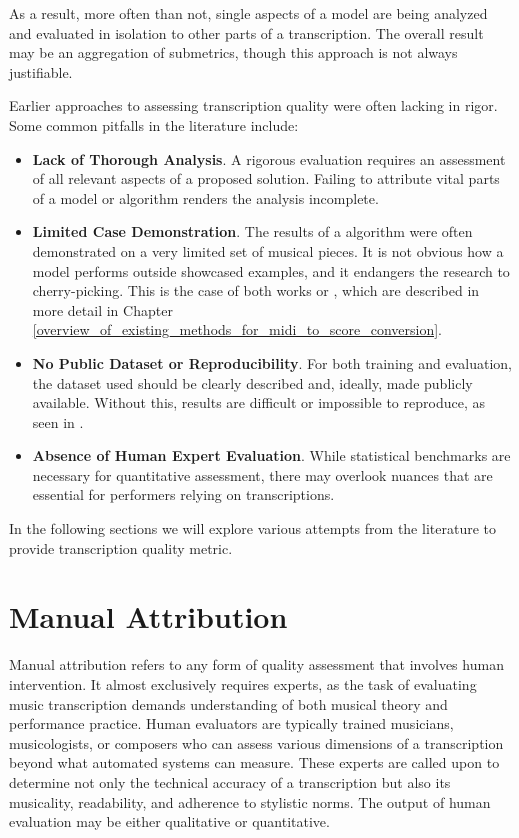 As a result, more often than not, single aspects of a model are being analyzed and evaluated in isolation to other parts of a transcription. The overall result may be an aggregation of submetrics, though this approach is not always justifiable.

Earlier approaches to assessing transcription quality were often lacking in rigor. Some common pitfalls in the literature include:\begin{itemize}
	\item {\bf Lack of Thorough Analysis}. A rigorous evaluation requires an assessment of all relevant aspects of a proposed solution. Failing to attribute vital parts of a model or algorithm renders the analysis incomplete.
	\item {\bf Limited Case Demonstration}. The results of a algorithm were often demonstrated on a very limited set of musical pieces. It is not obvious how a model performs outside showcased examples, and it endangers the research to cherry-picking. This is the case of both works \cite{Takeda2002} or \cite{Yang2005}, which are described in more detail in Chapter \ref{overview_of_existing_methods_for_midi_to_score_conversion}.
	\item {\bf No Public Dataset or Reproducibility}. For both training and evaluation, the dataset used should be clearly described and, ideally, made publicly available. Without this, results are difficult or impossible to reproduce, as seen in \cite{Takeda2002}.
	\item {\bf Absence of Human Expert Evaluation}. While statistical benchmarks are necessary for quantitative assessment, there may overlook nuances that are essential for performers relying on transcriptions. 
\end{itemize} 

In the following sections we will explore various attempts from the literature to provide transcription quality metric.

\section{Manual Attribution}

Manual attribution refers to any form of quality assessment that involves human intervention. It almost exclusively requires experts, as the task of evaluating music transcription demands understanding of both musical theory and performance practice. Human evaluators are typically trained musicians, musicologists, or composers who can assess various dimensions of a transcription beyond what automated systems can measure. These experts are called upon to determine not only the technical accuracy of a transcription but also its musicality, readability, and adherence to stylistic norms. The output of human evaluation may be either qualitative or quantitative. 

